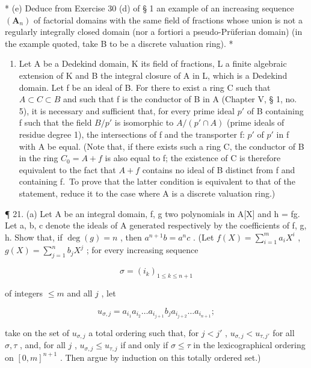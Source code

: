 * (e) Deduce from Exercise 30 (d) of § 1 an example of an increasing sequence \((\mathbf{A}_n)\) of factorial domains with the same field of fractions whose union is not a regularly integrally closed domain (nor a fortiori a pseudo-Prüferian domain) (in the example quoted, take B to be a discrete valuation ring). *

\begin{enumerate}
\def\labelenumi{\arabic{enumi}.}
\setcounter{enumi}{19}
\tightlist
\item
  Let A be a Dedekind domain, K its field of fractions, L a finite algebraic extension of K and B the integral closure of A in L, which is a Dedekind domain. Let f be an ideal of B. For there to exist a ring C such that \(A \subset C \subset B\) and such that f is the conductor of B in A (Chapter V, § 1, no. 5), it is necessary and sufficient that, for every prime ideal \(p'\) of B containing f such that the field \(B/p'\) is isomorphic to \(A/(p' \cap A)\) (prime ideals of residue degree 1), the intersections of f and the transporter f: \(p'\) of \(p'\) in f with A be equal. (Note that, if there exists such a ring C, the conductor of B in the ring \(C_{0} = A + f\) is also equal to f; the existence of C is therefore equivalent to the fact that \(A + f\) contains no ideal of B distinct from f and containing f.~To prove that the latter condition is equivalent to that of the statement, reduce it to the case where A is a discrete valuation ring.)
\end{enumerate}

¶ 21. (a) Let A be an integral domain, f, g two polynomials in A{[}X{]} and h = fg. Let a, b, c denote the ideals of A generated respectively by the coefficients of f, g, h. Show that, if \(\deg(g) = n\) , then \(a^{n+1}b = a^{n}c\) . (Let \(f(X) = \sum_{i=1}^{m} a_{i}X^{i}\) , \(g(X) = \sum_{j=1}^{n} b_{j}X^{j}\) ; for every increasing sequence

\[
\sigma = (i _ {k}) _ {1 \leqslant k \leqslant n + 1}
\]

of integers \(\leqslant m\) and all \(j\) , let

\[
u _ {\sigma , j} = a _ {i _ {1}} a _ {i _ {2}} \dots a _ {i _ {j + 1}} b _ {j} a _ {i _ {j + 2}} \dots a _ {i _ {n + 1}};
\]

take on the set of \(u_{\sigma,j}\) a total ordering such that, for \(j < j'\) , \(u_{\sigma,j} < u_{\tau,j'}\) for all \(\sigma, \tau\) , and, for all \(j\) , \(u_{\sigma,j} \leqslant u_{\tau,j}\) if and only if \(\sigma \leqslant \tau\) in the lexicographical ordering on \([0, m]^{n+1}\) . Then argue by induction on this totally ordered set.)

